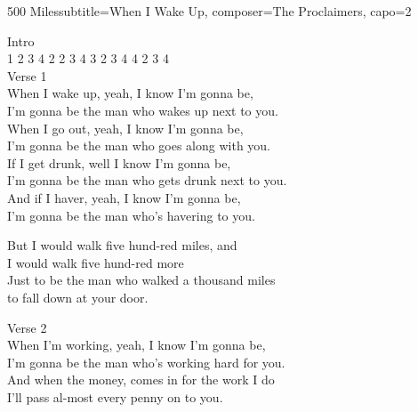 \begin{song}{500 Miles}{subtitle={When I Wake Up}, composer={The Proclaimers}, capo={2}}

Intro \\
 1 2 3 4     2 2 3 4     3 2 3 4     4 2 3 4 \\

Verse 1 \\
When I wake up, yeah, I know I'm gonna be, \\
I'm gonna be the man who wakes up next to you. \\

When I go out, yeah, I know I'm gonna be, \\
I'm gonna be the man who goes along with you. \\

If I get drunk, well I know I'm gonna be, \\
I'm gonna be the man who gets drunk next to you. \\

And if I haver, yeah, I know I'm gonna be, \\
I'm gonna be the man who's havering to you. \\

\begin{songChorus}
But I would walk  five hund-red miles, and \\
I    would     walk    five hund-red    more \\
Just to be the man who walked a thousand miles \\
to fall down at your door.     \\
\end{songChorus}

Verse 2 \\
When I'm working, yeah, I know I'm gonna be, \\
I'm gonna be the man who's working hard for you. \\

And when the money,    comes in for the work I do \\
I'll pass al-most every penny on to you. \\


\end{song}
